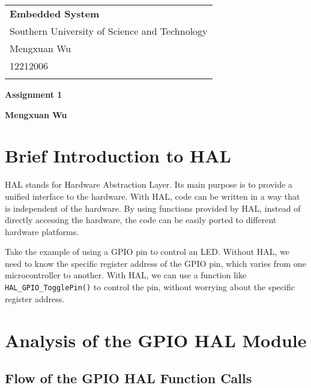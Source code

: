 \documentclass[a4paper,12pt]{article}
\begin{document}
\thispagestyle{empty} %

\begin{tabular}{p{15.5cm}}
{\large \bf Embedded System} \\
Southern University of Science and Technology \\ Mengxuan Wu \\ 12212006 \\
\hline
\\
\end{tabular}

\vspace*{0.3cm} %

\begin{center}
	{\Large \bf Assignment 1}
	\vspace{2mm}

	{\bf Mengxuan Wu}
		
\end{center}  

\vspace{0.4cm}

\section{Brief Introduction to HAL}

HAL stands for Hardware Abstraction Layer. Its main purpose is to provide a unified interface to the hardware. With HAL, code can be written in a way that is independent of the hardware. By using functions provided by HAL, instead of directly accessing the hardware, the code can be easily ported to different hardware platforms.

Take the example of using a GPIO pin to control an LED. Without HAL, we need to know the specific register address of the GPIO pin, which varies from one microcontroller to another. With HAL, we can use a function like \texttt{HAL\_GPIO\_TogglePin()} to control the pin, without worrying about the specific register address.

\section{Analysis of the GPIO HAL Module}

\subsection{Flow of the GPIO HAL Function Calls}
\end{document}
